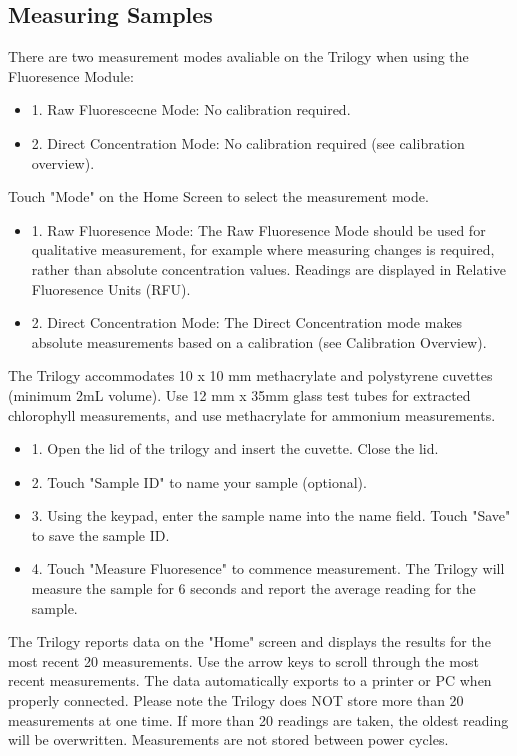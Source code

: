 \documentclass[12pt]{../SOP3_beta}
\begin{document}
\subsection{Measuring Samples}
\NP There are two measurement modes avaliable on the Trilogy when using the Fluoresence Module:
\begin{itemize}
  \item 1. Raw Fluorescecne Mode: No calibration required.
  \item 2. Direct Concentration Mode: No calibration required (see calibration overview).
\end{itemize}
\NP Touch "Mode" on the Home Screen to select the measurement mode.
\begin{itemize}
  \item 1. Raw Fluoresence Mode: The Raw Fluoresence Mode should be used for qualitative measurement, for example where measuring changes is required, rather than absolute concentration values. Readings are displayed in Relative Fluoresence Units (RFU).
  \item 2. Direct Concentration Mode: The Direct Concentration mode makes absolute measurements based on a calibration (see Calibration Overview).
\end{itemize}

\NP The Trilogy accommodates 10 x 10 mm methacrylate and polystyrene cuvettes (minimum 2mL volume). Use 12 mm x 35mm glass test tubes for extracted chlorophyll measurements, and use methacrylate for ammonium measurements.
\begin{itemize}
  \item 1. Open the lid of the trilogy and insert the cuvette. Close the lid.
  \item 2. Touch "Sample ID" to name your sample (optional).
  \item 3. Using the keypad, enter the sample name into the name field. Touch "Save" to save the sample ID.
  \item 4. Touch "Measure Fluoresence" to commence measurement. The Trilogy will measure the sample for 6 seconds and report the average reading for the sample. 
\end{itemize}

\NP The Trilogy reports data on the "Home" screen and displays the results for the most recent 20 measurements. Use the arrow keys to scroll through the most recent measurements. The data automatically exports to a printer or PC when properly connected. Please note the Trilogy does NOT store more than 20 measurements at one time. If more than 20 readings are taken, the oldest reading will be overwritten. Measurements are not stored between power cycles. 
\end{document}
